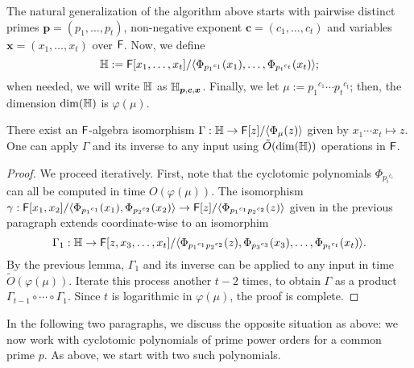   The natural
generalization of the algorithm above starts with pairwise distinct
primes $\boldsymbol{p}=(p_1,\dots,p_t)$, non-negative exponent
$\boldsymbol{c}=(c_1,\dots,c_t)$ and variables
$\boldsymbol{x}=(x_1,\dots,x_t)$ over ${\mathsf{F}}$. Now, we define
$$\mathbb{H}:={\mathsf{F}}[x_1,\dots,x_t]/\langle
\Phi_{{p_1}^{c_1}}(x_1),\dots,\Phi_{{p_t}^{c_t}}(x_t)\rangle;$$ when
needed, we will write $\mathbb{H}$ as
$\mathbb{H}_{\boldsymbol{p},\boldsymbol{c},\boldsymbol{x}}$. Finally, we let
$\mu:={p_1}^{c_1}\cdots {p_t}^{c_t}$; then, the dimension $\dim(\mathbb{H})$ is
$\varphi(\mu)$.

\begin{lemma}\label{lemma:distinctP}
 There exist an ${\mathsf{F}}$-algebra isomorphism $\Gamma: \mathbb{H} \to
 {\mathsf{F}}[z]/\langle\Phi_{\mu}(z)\rangle$ given by $x_1 \cdots x_t \mapsto
 z$.  One can apply $\Gamma$ and its inverse to any input using
 $\tilde{O}(\dim(\mathbb{H}))$ operations in ${\mathsf{F}}$.
\end{lemma}
\begin{proof}
  We proceed iteratively. First, note that the cyclotomic polynomials
  $\Phi_{{p_i}^{c_i}}$ can all be computed in time $O(\varphi(\mu))$. 
  The isomorphism
  $\gamma: {\mathsf{F}}[x_1,x_2]/\langle \Phi_{{p_1}^{c_1}}(x_1),
  \Phi_{{p_2}^{c_2}}(x_2)\rangle \to {\mathsf{F}}[z]/\langle
  \Phi_{{p_1}^{c_1}{p_2}^{c_2}}(z)\rangle$
given in the previous paragraph extends coordinate-wise to an
  isomorphim
  $$\Gamma_1: \mathbb{H} \to {\mathsf{F}}[z,x_3,\dots,x_t]/\langle
  \Phi_{{p_1}^{c_1}{p_2}^{c_2}}(z),\Phi_{{p_3}^{c_3}}(x_3),\dots,\Phi_{{p_t}^{c_t}}(x_t)\rangle.$$
  By the previous lemma, $\Gamma_1$ and its inverse can be applied to
  any input in time $\tilde{O}(\varphi(\mu))$. Iterate this process
  another $t-2$ times, to obtain $\Gamma$ as a product
  $\Gamma_{t-1} \circ \cdots \circ \Gamma_1$. Since $t$ is logarithmic 
  in $\varphi(\mu)$, the proof is complete.
\end{proof}

In the following two paragraphs, we discuss the opposite situation as
above: we now work with cyclotomic polynomials of prime power
orders for a common prime $p$. As above, we start with two such polynomials.

